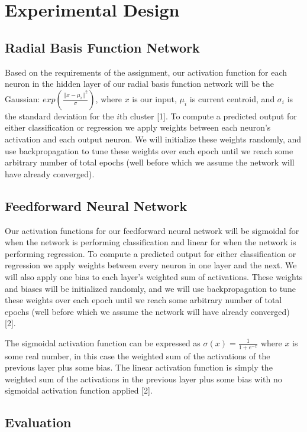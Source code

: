 \documentclass{article}
\begin{document}
\section{Experimental Design}

\subsection*{Radial Basis Function Network}
Based on the requirements of the assignment, our activation function for each neuron in the hidden layer of our radial basis function network will be the Gaussian: $exp(\frac{||x-\mu_i||^2}{\sigma})$, where $x$ is our input, $\mu_i$ is current centroid, and $\sigma_i$ is the standard deviation for the $i$th cluster [1]. To compute a predicted output for either classification or regression we apply weights between each neuron's activation and each output neuron. We will initialize these weights randomly, and use backpropagation to tune these weights over each epoch until we reach some arbitrary number of total epochs (well before which we assume the network will have already converged).

\subsection*{Feedforward Neural Network}

Our activation functions for our feedforward neural network will be sigmoidal for when the network is performing classification and linear for when the network is performing regression. To compute a predicted output for either classification or regression we apply weights between every neuron in one layer and the next. We will also apply one bias to each layer's weighted sum of activations. These weights and biases will be initialized randomly, and we will use backpropagation to tune these weights over each epoch until we reach some arbitrary number of total epochs (well before which we assume the network will have already converged) [2].

The sigmoidal activation function can be expressed as $\sigma(x) = \frac{1}{1 + e^{-x}}$ where $x$ is some real number, in this case the weighted sum of the activations of the previous layer plus some bias. The linear activation function is simply the weighted sum of the activations in the previous layer plus some bias with no sigmoidal activation function applied [2].

\subsection*{Evaluation}
\end{document}
